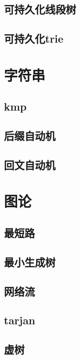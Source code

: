 \documentclass[UTF8,a4paper]{ctexart}
\begin{document}
\subsection{可持久化线段树}

\subsection{可持久化trie}

\section{字符串}

\subsection{kmp}





\subsection{后缀自动机}

\subsection{回文自动机}

\section{图论}

\subsection{最短路}

\subsection{最小生成树}

\subsection{网络流}

\subsection{tarjan}

\subsection{虚树}
\end{document}
